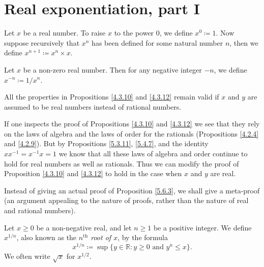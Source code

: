 \section{Real exponentiation, part I}

\begin{definition}\label{5.6.1}
Let \(x\) be a real number.
To raise \(x\) to the power \(0\), we define \(x^0 \coloneqq 1\).
Now suppose recursively that \(x^n\) has been defined for some natural number \(n\), then we define \(x^{n + 1} \coloneqq x^n \times x\).
\end{definition}

\begin{definition}\label{5.6.2}
Let \(x\) be a non-zero real number.
Then for any negative integer \(-n\), we define \(x^{-n} \coloneqq 1 / x^n\).
\end{definition}

\begin{proposition}\label{5.6.3}
All the properties in Propositions \ref{4.3.10} and \ref{4.3.12} remain valid if \(x\) and \(y\) are assumed to be real numbers instead of rational numbers.
\end{proposition}

\begin{meta-proof}
If one inspects the proof of Propositions \ref{4.3.10} and \ref{4.3.12} we see that they rely on the laws of algebra and the laws of order for the rationals (Propositions \ref{4.2.4} and \ref{4.2.9}).
But by Propositions \ref{5.3.11}, \ref{5.4.7}, and the identity \(xx^{-1} = x^{-1} x = 1\) we know that all these laws of algebra and order continue to hold for real numbers as well as rationals.
Thus we can modify the proof of Proposition \ref{4.3.10} and \ref{4.3.12} to hold in the case when \(x\) and \(y\) are real.
\end{meta-proof}

\begin{note}
Instead of giving an actual proof of Proposition \ref{5.6.3}, we shall give a meta-proof
(an argument appealing to the nature of proofs, rather than the nature of real and rational numbers).
\end{note}

\begin{definition}\label{5.6.4}
Let \(x \geq 0\) be a non-negative real, and let \(n \geq 1\) be a positive integer.
We define \(x^{1 / n}\), also known as the \emph{\(n^{\text{th}}\) root of \(x\)}, by the formula
\[
    x^{1 / n} \coloneqq \sup\{y \in \mathds{R} : y \geq 0 \text{ and } y^n \leq x\}.
\]
We often write \(\sqrt{x}\) for \(x^{1 / 2}\).
\end{definition}

